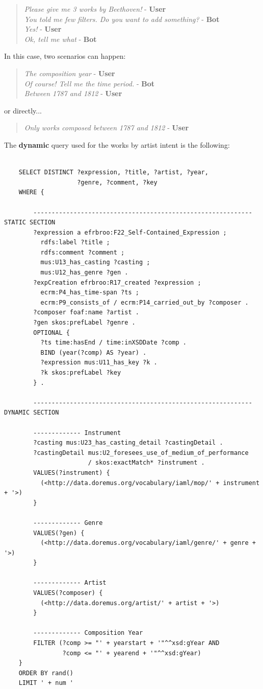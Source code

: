 \documentclass[a4paper,12pt]{report}
\begin{document}
	\begin{verse}
	\textit{Please give me 3 works by Beethoven!} - \textbf{User}\\
	\textit{You told me few filters. Do you want to add something?} - \textbf{Bot}\\
	\textit{Yes!} - \textbf{User}\\
	\textit{Ok, tell me what} - \textbf{Bot}\\
	\end{verse}
	In this case, two scenarios can happen:
	\begin{verse}
	\textit{The composition year} - \textbf{User}\\
	\textit{Of course! Tell me the time period.} - \textbf{Bot}\\
	\textit{Between 1787 and 1812} - \textbf{User}\\
	\end{verse}
	or directly...
	\begin{verse}
	\textit{Only works composed between 1787 and 1812} - \textbf{User}\\
	\end{verse}
	The \textbf{dynamic} query used for the works by artist intent is the following:
	\begin{lstlisting}
	
	SELECT DISTINCT ?expression, ?title, ?artist, ?year,
	                ?genre, ?comment, ?key
	WHERE {
	
		------------------------------------------------------------ STATIC SECTION
		?expression a efrbroo:F22_Self-Contained_Expression ;
		  rdfs:label ?title ;
		  rdfs:comment ?comment ;
		  mus:U13_has_casting ?casting ;
		  mus:U12_has_genre ?gen .
		?expCreation efrbroo:R17_created ?expression ;
		  ecrm:P4_has_time-span ?ts ;
		  ecrm:P9_consists_of / ecrm:P14_carried_out_by ?composer .
		?composer foaf:name ?artist .
		?gen skos:prefLabel ?genre .
		OPTIONAL {
		  ?ts time:hasEnd / time:inXSDDate ?comp .
		  BIND (year(?comp) AS ?year) .
		  ?expression mus:U11_has_key ?k .
		  ?k skos:prefLabel ?key
		} .
		
		------------------------------------------------------------ DYNAMIC SECTION
		
		------------- Instrument
		?casting mus:U23_has_casting_detail ?castingDetail .
		?castingDetail mus:U2_foresees_use_of_medium_of_performance
		               / skos:exactMatch* ?instrument .
		VALUES(?instrument) {
		  (<http://data.doremus.org/vocabulary/iaml/mop/' + instrument + '>)
		}
		
		------------- Genre
		VALUES(?gen) {
		  (<http://data.doremus.org/vocabulary/iaml/genre/' + genre + '>)
		}
		
		------------- Artist
		VALUES(?composer) {
		  (<http://data.doremus.org/artist/' + artist + '>)
		}
		
		------------- Composition Year
		FILTER (?comp >= "' + yearstart + '"^^xsd:gYear AND
		        ?comp <= "' + yearend + '"^^xsd:gYear)
	}
	ORDER BY rand()
	LIMIT ' + num '
	\end{lstlisting}
\end{document}
